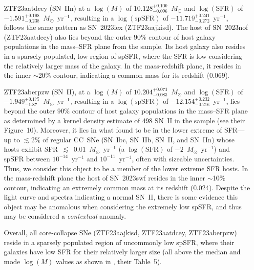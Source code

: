 \documentclass[twocolumn]{aastex63}
\begin{document}
ZTF23aatdcey (SN~IIn) at a $\log(M)$ of $10.128^{+0.100}_{-0.096}$~$M_{\odot}$ and $\log(\text{SFR})$ of $-1.591^{+0.198}_{-0.238}$~$M_{\odot}$~yr$^{-1}$, resulting in a $\log(\text{spSFR})$ of $-11.719^{+0.241}_{-0.272}$~yr$^{-1}$, follows the same pattern as SN~2023iex (ZTF23aajkisd). The host of SN~2023nof (ZTF23aatdcey) also lies beyond the outer 90\% contour of host galaxy populations in the mass–SFR plane from the \cite{PalomarHostModelingSchulze2021} sample. Its host galaxy also resides in a sparsely populated, low region of spSFR, where the SFR is low considering the relatively larger mass of the galaxy. In the mass-redshift plane, it resides in the inner $\sim$20\% contour, indicating a common mass for its redshift (0.069).  \par

ZTF23aberpzw (SN~II), at a $\log(M)$ of $10.204^{+0.071}_{-0.083}$~$M_{\odot}$ and $\log(\text{SFR})$ of $-1.949^{+0.175}_{-1.87}$~$M_{\odot}$~yr$^{-1}$, resulting in a $\log(\text{spSFR})$ of $-12.154^{+0.232}_{-0.216}$~yr$^{-1}$, lies beyond the outer 90\% contour of host galaxy populations in the mass–SFR plane as determined by a kernel density estimate of 498 SN~II in the \cite{PalomarHostModelingSchulze2021} sample (see their Figure~10). Moreover, it lies in what \cite{PalomarHostModelingSchulze2021} found to be in the lower extreme of SFR---up to $\lesssim$2\% of regular CC~SNe (SN~Ibc, SN~IIb, SN~II, and SN~IIn) whose hosts exhibit SFR~$\lesssim$~0.01~$M_{\odot}$~yr$^{-1}$ (a $\log(\text{SFR})$ of $-2$~$M_{\odot}$~yr$^{-1}$) and spSFR between $10^{-14}$~yr$^{-1}$ and $10^{-11}$~yr$^{-1}$, often with sizeable uncertainties. Thus, we consider this object to be a member of the lower extreme SFR hosts. In the mass-redshift plane the host of SN~2023swf resides in the inner $\sim$10\% contour, indicating an extremely common mass at its redshift (0.024). Despite the light curve and spectra indicating a normal SN~II, there is some evidence this object may be anomalous when considering the extremely low spSFR, and thus may be considered a \emph{contextual} anomaly. \par 

Overall, all core-collapse SNe (ZTF23aajkisd, ZTF23aatdcey, ZTF23aberpzw) reside in a sparsely populated region of uncommonly low spSFR, where their galaxies have low SFR for their relatively larger size (all above the median and mode $\log(M)$ values as shown in \cite{PalomarHostModelingSchulze2021}, their Table~5). \par
\end{document}
